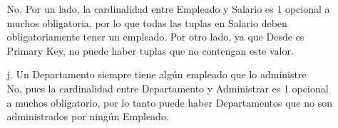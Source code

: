 \documentclass[12pt,a4paper]{article}
\begin{document}
\begin{enumerate}
\begin{enumerate}
            No. Por un lado, la cardinalidad entre Empleado y Salario es 1 opcional a muchos obligatoria, por lo que todas las tuplas en Salario deben obligatoriamente tener un empleado. Por otro lado, ya que Desde es Primary Key, no puede haber tuplas que no contengan este valor.\\
                
            \item[j.] Un Departamento siempre tiene algún empleado que lo administre\\
            
            No, pues la cardinalidad entre Departamento y Administrar es 1 opcional a muchos obligatorio, por lo tanto puede haber Departamentos que no son administrados por ningún Empleado.\\
        
        \end{enumerate}

\end{enumerate}
\end{document}
